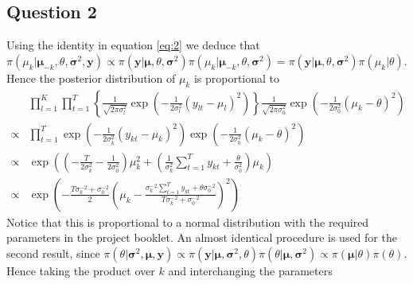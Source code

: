 \documentclass[10pt,a4paper,notitlepage]{article}
\newcommand{\y}{\mathbf{y}}
\begin{document}
\subsection*{\centering Question 2}
Using the identity in equation \eqref{eq:2} we deduce that $\pi(\mu_{k}|\bm{\mu}_{-k},\theta,\bm{\sigma}^{2},\y)\propto \pi(\y|\bm{\mu},\theta,\bm{\sigma}^{2})\pi(\mu_{k}|\bm{\mu}_{-k},\theta,\bm{\sigma}^{2})=\pi(\y|\bm{\mu},\theta,\bm{\sigma}^{2})\pi(\mu_{k}|\theta)$.
Hence the posterior distribution of $\mu_{k}$ is proportional to
\begin{equation}
\begin{aligned}
&\prod_{l=1}^{K}\prod_{t=1}^{T}\left\{\frac{1}{\sqrt{2\pi \sigma_{l}^{2}}}\exp\left(-\frac{1}{2\sigma_{l}^{2}}\left(y_{lt}-\mu_{l}\right)^{2}\right)\right\}\frac{1}{\sqrt{2\pi\sigma_{0}^{2}}}\exp\left(-\frac{1}{2\sigma_{0}^{2}}\left(\mu_{k}-\theta\right)^{2}\right)\\
\propto &\prod_{t=1}^{T}\exp\left(-\frac{1}{2\sigma_{k}^{2}}\left(y_{kt}-\mu_{k}\right)^{2}\right)\exp\left(-\frac{1}{2\sigma_{0}^{2}}\left(\mu_{k}-\theta\right)^{2}\right)\\
\propto &\exp\left(\left(-\frac{T}{2\sigma_{k}^{2}}-\frac{1}{2\sigma_{0}^{2}}\right)\mu_{k}^{2}+\left(\frac{1}{\sigma_{k}^{2}}\sum_{t=1}^{T}y_{kt}+\frac{\theta}{\sigma_{0}^{2}}\right)\mu_{k}\right)\\
\propto &\exp\left(-\frac{T\sigma_{k}^{-2}+\sigma_{0}^{-2}}{2}\left(\mu_{k}-\frac{\sigma_{k}^{-2}\sum_{t=1}^{T}y_{kt}+\theta\sigma_{0}^{-2}}{T\sigma_{k}^{-2}+\sigma_{0}^{-2}}\right)^{2}\right)
\end{aligned}
\end{equation}
Notice that this is proportional to a normal distribution with the required parameters in the project booklet. An almost identical procedure is used for the second result, since $\pi(\theta |\bm{\sigma}^{2},\bm{\mu},\y)\propto \pi(\y|\bm{\mu},\bm{\sigma}^{2},\theta)\pi(\theta|\bm{\mu},\bm{\sigma}^{2})\propto\pi(\bm{\mu}|\theta)\pi(\theta)$. Hence taking the product over $k$ and interchanging the parameters
\end{document}
